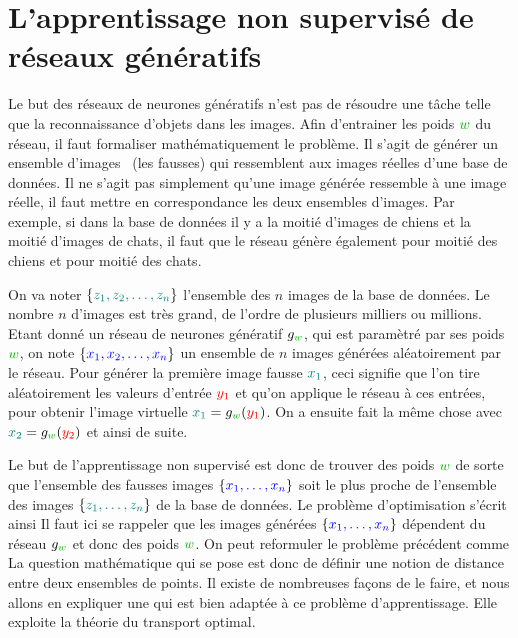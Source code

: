 \section{L'apprentissage non supervisé de réseaux génératifs}
\label{sec-app-gen}

Le but des réseaux de neurones génératifs n'est pas de résoudre une tâche telle que la reconnaissance d'objets dans les images. 
%
Afin d'entrainer les poids $\mygreen{w}$ du réseau, il faut formaliser mathématiquement le problème. Il s'agit de générer un ensemble d'images  (les fausses) qui ressemblent aux images réelles d'une base de données. Il ne s'agit pas simplement qu'une image générée ressemble à une image réelle, il faut mettre en correspondance les deux ensembles d'images. Par exemple, si dans la base de données il y a la moitié d'images de chiens et la moitié d'images de chats, il faut que le réseau génère également pour moitié des chiens et pour moitié des chats. 

On va noter $\{\mylblue{z_1,z_2,\ldots,z_n}\}$ l'ensemble des $n$ images de la base de données. Le nombre $n$ d'images est très grand, de l'ordre de plusieurs milliers ou millions. Etant donné un réseau de neurones génératif $g_{\mygreen{w}}$, qui est paramètré par ses poids $\mygreen{w}$, on note $\{\myblue{x_1,x_2,\ldots,x_n}\}$ un ensemble de $n$ images  générées aléatoirement par le réseau. Pour générer la première image fausse $\mylblue{x_1}$, ceci signifie que l'on tire aléatoirement les valeurs d'entrée ${\color{red}y_1}$ et qu'on applique le réseau à ces entrées, pour obtenir l'image virtuelle $\mylblue{x_1} = g_{\mygreen{w}}({\color{red}y_1})$. On a ensuite fait la même chose avec $\mylblue{x_2} = g_{\mygreen{w}}({\color{red}y_2})$ et ainsi de suite. 

Le but de l'apprentissage non supervisé est donc de trouver des poids $\mygreen{w}$ de sorte que l'ensemble des fausses images $\{\myblue{x_1,\ldots,x_n}\}$ soit le plus proche de l'ensemble des images $\{\mylblue{z_1,\ldots,z_n}\}$  de la base de données. Le problème d'optimisation s'écrit ainsi 
Il faut ici se rappeler que les images générées $\{\myblue{x_1, \ldots, x_n} \}$ dépendent du réseau $g_{\mygreen{w}}$ et donc des poids $\mygreen{w}$. On peut reformuler le problème précédent comme
%
La question mathématique qui se pose est donc de définir une notion de distance entre deux ensembles de points. Il existe de nombreuses façons de le faire, et nous allons en expliquer une qui est bien adaptée à ce problème d'apprentissage. 
%
Elle exploite la théorie du transport optimal.


